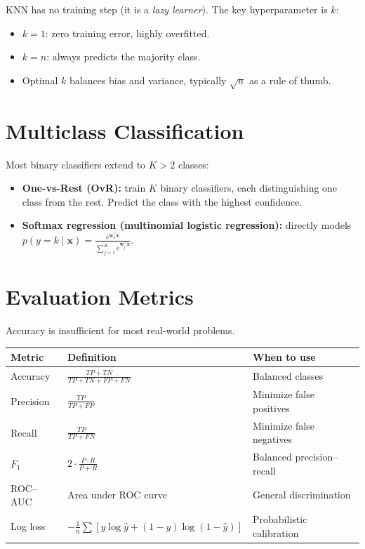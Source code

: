 KNN has no training step (it is a \emph{lazy learner}). The key hyperparameter is $k$:

\begin{itemize}
	\item $k = 1$: zero training error, highly overfitted.
	\item $k = n$: always predicts the majority class.
	\item Optimal $k$ balances bias and variance, typically $\sqrt{n}$ as a rule of thumb.
\end{itemize}

\section{Multiclass Classification}

Most binary classifiers extend to $K > 2$ classes:

\begin{itemize}
	\item \textbf{One-vs-Rest (OvR):} train $K$ binary classifiers, each distinguishing one class from the rest. Predict the class with the highest confidence.
	\item \textbf{Softmax regression (multinomial logistic regression):} directly models $p(y = k \mid \mathbf{x}) = \frac{e^{\mathbf{w}_k^\top \mathbf{x}}}{\sum_{j=1}^K e^{\mathbf{w}_j^\top \mathbf{x}}}$.
\end{itemize}

\section{Evaluation Metrics}

Accuracy is insufficient for most real-world problems.

\begin{longtable}{p{3cm}p{5cm}p{4cm}}
	\toprule
	\textbf{Metric} & \textbf{Definition}                                      & \textbf{When to use}       \\
	\midrule
	Accuracy        & $\frac{TP + TN}{TP + TN + FP + FN}$                      & Balanced classes           \\
	Precision       & $\frac{TP}{TP + FP}$                                     & Minimize false positives   \\
	Recall          & $\frac{TP}{TP + FN}$                                     & Minimize false negatives   \\
	$F_1$           & $2 \cdot \frac{P \cdot R}{P + R}$                        & Balanced precision--recall \\
	ROC--AUC        & Area under ROC curve                                     & General discrimination     \\
	Log loss        & $-\frac1n \sum [y \log \hat{y} + (1-y) \log(1-\hat{y})]$ & Probabilistic calibration  \\
	\bottomrule
\end{longtable}

